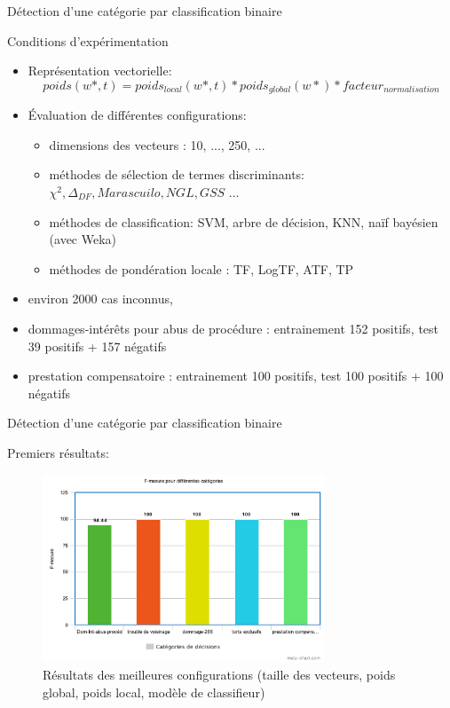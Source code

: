\documentclass[newPxFont,pagenumber]{beamer}
\begin{document}
\begin{frame}{ Détection d'une catégorie par classification binaire}

Conditions d'expérimentation

\begin{itemize}
\small
\item Représentation vectorielle: {\small \[ poids(w*, t) = poids_{local}(w*, t) * poids_{global}(w*) * facteur_{normalisation}\]}
\item Évaluation de différentes configurations:
\begin{itemize}
\item dimensions des vecteurs : 10, ..., 250, ...
\item méthodes de sélection de termes discriminants: $\chi^2, \Delta_{DF}, Marascuilo, NGL, GSS $  ...
\item méthodes de classification: SVM, arbre de décision, KNN, naïf bayésien (avec Weka\cite{Eibe2016Weka})
\item méthodes de pondération locale : TF, LogTF, ATF, TP
\end{itemize}
\item environ 2000 cas inconnus, 
\item dommages-intérêts pour abus de procédure : entrainement 152 positifs, test 39 positifs + 157 négatifs
\item prestation compensatoire : entrainement 100 positifs, test 100 positifs + 100 négatifs
\end{itemize}
\end{frame}

\begin{frame}{Détection d'une catégorie par classification binaire}

Premiers résultats:


\begin{figure}
\includegraphics[width=0.75\textwidth]{f-mesure-classif.png}
\caption{Résultats des meilleures configurations (taille des vecteurs, poids global, poids local, modèle de classifieur)}
\end{figure}
\end{frame}
\end{document}
